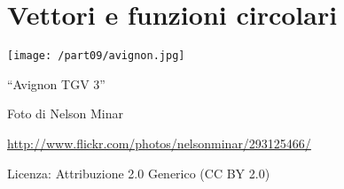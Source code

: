 \part{Vettori e funzioni circolari}
\texttt{[image: /part09/avignon.jpg]}
  \begin{center}
    {\large ``Avignon TGV 3''}\par
    Foto di Nelson Minar\par
    \url{http://www.flickr.com/photos/nelsonminar/293125466/}\par
    Licenza: Attribuzione 2.0 Generico (CC BY 2.0)\par
  \end{center}
\clearpage
\cleardoublepage
